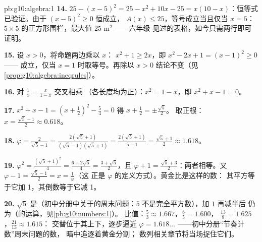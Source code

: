 \begin{solution}{pb:g10:algebra:1}
\textbf{14.} $25 - (x - 5)^2 = 25 - x^2 + 10x - 25 =
x(10 - x)$：恒等式已验证。由于 $(x-5)^2 \geq 0$ 恒成立，
$A(x) \leq 25$，等号成立当且仅当 $x = 5$：
$5 \times 5$ 的正方形围栏，最大值 $25$ m$^2$ ——六年级
见过的表格，如今只需两行即可证明。

\textbf{15.} 设 $x > 0$，将命题两边乘以 $x$：
$x^2 + 1 \geq 2x$，即 $x^2 - 2x + 1 = (x - 1)^2 \geq 0$ ——
成立，仅当 $x = 1$ 时取等号。再除以 $x > 0$
结论不变（见\cref{prop:g10:algebra:ineqrules}）。

\textbf{16.} 对 $\frac1x = \frac{x}{1 - x}$ 交叉相乘
（各长度均为正）：$x^2 = 1 - x$，即
$x^2 + x - 1 = 0$。

\textbf{17.} $x^2 + x - 1 = \left(x + \frac12\right)^2 -
\frac54 = 0$ 得 $x + \frac12 = \pm\frac{\sqrt5}{2}$。
取正根：$x = \frac{\sqrt5 - 1}{2} \approx 0.618$。

\textbf{18.} $\varphi = \frac{2}{\sqrt5 - 1} =
\frac{2(\sqrt5 + 1)}{(\sqrt5 - 1)(\sqrt5 + 1)}
= \frac{2(\sqrt5 + 1)}{5 - 1} = \frac{\sqrt5 + 1}{2}
\approx 1.618$。

\textbf{19.} $\varphi^2 = \frac{(\sqrt5 + 1)^2}{4} =
\frac{6 + 2\sqrt5}{4} = \frac{3 + \sqrt5}{2}$，且
$\varphi + 1 = \frac{\sqrt5 + 3}{2}$：两者相等。又
$\varphi - 1 = \frac{\sqrt5 - 1}{2} = x = \frac1\varphi$（这
正是 $\varphi$ 的定义方式）。黄金比是这样的数：
其平方等于它加 1，其倒数等于它减 1。

\textbf{20.} $\sqrt5$ 是（初中分册中关于的周末问题：$5$
不是完全平方数），加 $1$ 再减半后
仍为（的运算，见\cref{pb:g10:numbers:1}）。
比值：$\frac53 \approx 1.667$，$\frac85 = 1.600$，
$\frac{13}{8} = 1.625$，$\frac{21}{13} \approx 1.615$：
交替位于其上下，逐步逼近
$\varphi = 1.618\ldots$ ——初中分册“节奏计数”周末问题的数，
暗中追逐着黄金分割；
数列相关章节将当场捉住它们。
\end{solution}
